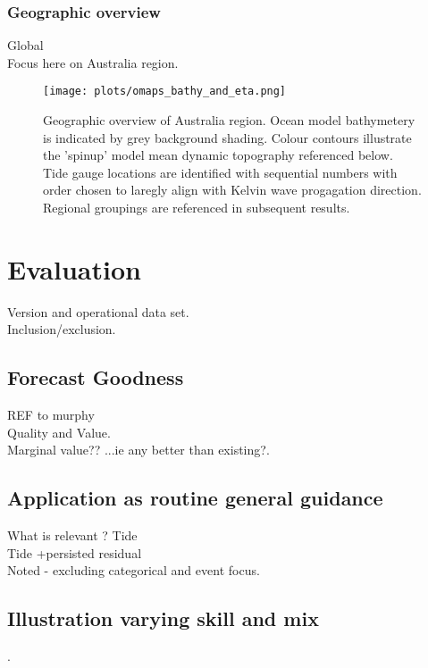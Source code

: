 \documentclass[jmse,article,submit,moreauthors,pdftex,10pt,a4paper]{mdpi}
\begin{document}
\subsubsection{Geographic overview}

Global\\
Focus here on Australia region.


\begin{figure}[H]
    \centering
    \texttt{[image: plots/omaps\_bathy\_and\_eta.png]}
    \caption{Geographic overview of Australia region.  Ocean model bathymetery is indicated by grey background shading.  Colour contours illustrate the 'spinup' model mean dynamic topography referenced below.  Tide gauge locations are identified with sequential numbers with order chosen to laregly align with Kelvin wave progagation direction. Regional groupings are referenced in subsequent results.}
    \label{fig:map_locations}
\end{figure}  


\section{Evaluation}


Version and operational data set.\\
Inclusion/exclusion.


\subsection{Forecast Goodness}

REF to murphy\\
Quality and Value.\\
Marginal value?? ...ie any better than existing?.\\



\subsection{Application as routine general guidance}

What is relevant ?
Tide\\
Tide +persisted residual\\

Noted - excluding categorical and event focus.



\subsection{Illustration varying skill and mix}.
\end{document}
